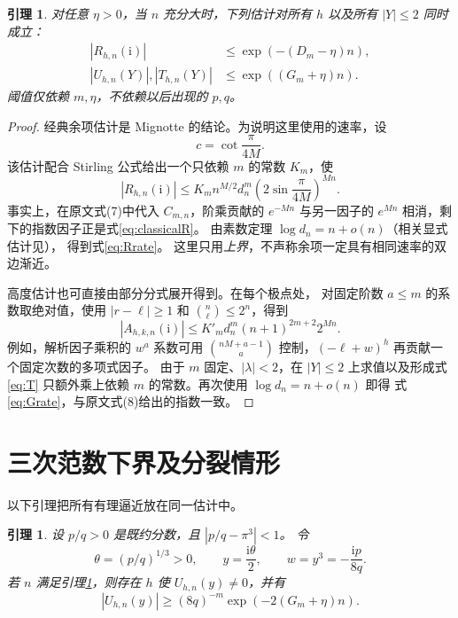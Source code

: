 \documentclass[UTF8,fontset=fandol,a4paper,11pt]{ctexart}
\newtheorem{lemma}[theorem]{引理}
\theoremstyle{remark}
\newcommand{\ii}{\mathrm i}
\numberwithin{equation}{section}
\begin{document}
\begin{lemma}\label{lem:rates}
对任意 $\eta>0$，当 $n$ 充分大时，下列估计对所有 $h$ 以及所有 $|Y|\le2$
同时成立：
\begin{align}
|R_{h,n}(\ii)|&\le \exp(-(D_m-\eta)n),\label{eq:Rrate}\\
|U_{h,n}(Y)|, |T_{h,n}(Y)|&\le \exp((G_m+\eta)n).
 \label{eq:Grate}
\end{align}
阈值仅依赖 $m,\eta$，不依赖以后出现的 $p,q$。
\end{lemma}

\begin{proof}
经典余项估计是 Mignotte\cite[第123页式(7)，及第129--130页附录I]{Mignotte1974}
的结论。为说明这里使用的速率，设
\[
c=\cot\frac{\pi}{4M}.
\]
该估计配合 Stirling 公式给出一个只依赖 $m$ 的常数 $K_m$，使
\begin{equation}\label{eq:classicalR}
|R_{h,n}(\ii)|
 \le K_m n^{M/2} d_n^m
      \left(2\sin\frac{\pi}{4M}\right)^{Mn}.
\end{equation}
事实上，在原文式(7)中代入 $C_{m,n}$，阶乘贡献的 $e^{-Mn}$
与另一因子的 $e^{Mn}$ 相消，剩下的指数因子正是式\eqref{eq:classicalR}。
由素数定理 $\log d_n=n+o(n)$（相关显式估计见\cite{RosserSchoenfeld1962}），
得到式\eqref{eq:Rrate}。
这里只用\emph{上界}，不声称余项一定具有相同速率的双边渐近。

高度估计也可直接由部分分式展开得到。在每个极点处，
对固定阶数 $a\le m$ 的系数取绝对值，使用
$|r-\ell|\ge1$ 和 $\binom n\ell\le2^n$，得到
\[
|A_{h,k,n}(\ii)|
 \le K'_m d_n^m(n+1)^{2m+2}2^{Mn}.
\]
例如，解析因子乘积的 $w^a$ 系数可用
$\binom{nM+a-1}{a}$ 控制，$(-\ell+w)^h$ 再贡献一个固定次数的多项式因子。
由于 $m$ 固定、$|\lambda|<2$，在 $|Y|\le2$ 上求值以及形成式\eqref{eq:T}
只额外乘上依赖 $m$ 的常数。再次使用 $\log d_n=n+o(n)$ 即得
式\eqref{eq:Grate}，与原文式(8)给出的指数一致。
\end{proof}

\section{三次范数下界及分裂情形}

以下引理把所有有理逼近放在同一估计中。

\begin{lemma}\label{lem:norm}
设 $p/q>0$ 是既约分数，且 $|p/q-\pi^3|<1$。
令
\[
\theta=(p/q)^{1/3}>0,\qquad y=\frac{\ii\theta}{2},
\qquad w=y^3=-\frac{\ii p}{8q}.
\]
若 $n$ 满足引理\ref{lem:rates}，则存在 $h$ 使 $U_{h,n}(y)\ne0$，并有
\begin{equation}\label{eq:normlower}
|U_{h,n}(y)|\ge(8q)^{-m}\exp(-2(G_m+\eta)n).
\end{equation}
\end{lemma}
\end{document}

